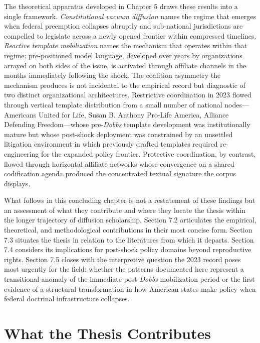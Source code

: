 The theoretical apparatus developed in Chapter 5 draws these results into a single framework. \textit{Constitutional vacuum diffusion} names the regime that emerges when federal preemption collapses abruptly and sub-national jurisdictions are compelled to legislate across a newly opened frontier within compressed timelines. \textit{Reactive template mobilization} names the mechanism that operates within that regime: pre-positioned model language, developed over years by organizations arrayed on both sides of the issue, is activated through affiliate channels in the months immediately following the shock. The coalition asymmetry the mechanism produces is not incidental to the empirical record but diagnostic of two distinct organizational architectures. Restrictive coordination in 2023 flowed through vertical template distribution from a small number of national nodes---Americans United for Life, Susan B. Anthony Pro-Life America, Alliance Defending Freedom---whose pre-\textit{Dobbs} template development was institutionally mature but whose post-shock deployment was constrained by an unsettled litigation environment in which previously drafted templates required re-engineering for the expanded policy frontier. Protective coordination, by contrast, flowed through horizontal affiliate networks whose convergence on a shared codification agenda produced the concentrated textual signature the corpus displays.
 
What follows in this concluding chapter is not a restatement of these findings but an assessment of what they contribute and where they locate the thesis within the longer trajectory of diffusion scholarship. Section 7.2 articulates the empirical, theoretical, and methodological contributions in their most concise form. Section 7.3 situates the thesis in relation to the literatures from which it departs. Section 7.4 considers its implications for post-shock policy domains beyond reproductive rights. Section 7.5 closes with the interpretive question the 2023 record poses most urgently for the field: whether the patterns documented here represent a transitional anomaly of the immediate post-\textit{Dobbs} mobilization period or the first evidence of a structural transformation in how American states make policy when federal doctrinal infrastructure collapses.
 
\section{What the Thesis Contributes}
 
